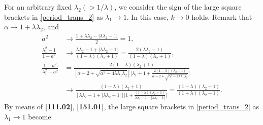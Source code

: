 \documentclass[11pt]{amsart}
\numberwithin{equation}{section}
\numberwithin{figure}{section}
\theoremstyle{plain} %
\theoremstyle{definition} %
\begin{document}
For an arbitrary fixed $\lambda_2(>1/\lambda)$, we consider the sign of the large square brackets in \eqref{period_trans_2} as $\lambda_1 \to 1$. In this case, $k\to 0$ holds. 
Remark that $\alpha\to 1+\lambda\lambda_2$, and 
\begin{align*}
 a^2 &\to \frac{1+\lambda\lambda_2-|\lambda\lambda_2-1|}{2}
=1, \\
 \frac{\lambda_1^2-1}{1-a^2} &\to \frac{\lambda\lambda_2-1+|\lambda\lambda_2-1|}{(1-\lambda)(\lambda_2+1)}
=\frac{2(\lambda\lambda_2-1)}{(1-\lambda)(\lambda_2+1)}, \\
 \frac{1-a^2}{\lambda_1^2-a^2} 
& = \frac{2(1-\lambda)(\lambda_2+1)}{[\alpha-2+\sqrt{\alpha^2-4\lambda\lambda_1\lambda_2}]\bigg[\lambda_1+1+\frac{2(1-\lambda)(\lambda_2+1)}{\alpha-2+\sqrt{\alpha^2-4\lambda\lambda_1\lambda_2}}\bigg] } \\
& \to \frac{(1-\lambda)(\lambda_2+1)}{[\lambda\lambda_2-1+|\lambda\lambda_2-1|]
\bigg[1+\frac{(1-\lambda)(\lambda_2+1)}{\lambda\lambda_2-1+|\lambda\lambda_2-1|}\bigg]}
=\frac{(1-\lambda)(\lambda_2+1)}{(1+\lambda)(\lambda_2-1)}.
\end{align*}
By means of \textbf{[111.02]}, \textbf{[151.01]}, 
the large square brackets in \eqref{period_trans_2} as $\lambda_1 \to 1$ become  
\end{document}
